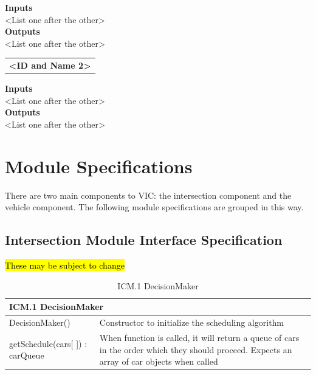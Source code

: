 \documentclass [10pt]{article}
\begin{document}
\textbf{Inputs} \\
<List one after the other> \\

\textbf{Outputs} \\
<List one after the other> \\

\begin{longtable}{p{}}
\rowcolor{tableCell}\textbf{<ID and Name 2>} \\
\end{longtable}

\textbf{Inputs} \\
<List one after the other> \\

\textbf{Outputs} \\
<List one after the other> \\



\section{Module Specifications}

There are two main components to VIC: the intersection component and the vehicle component. The following module specifications are grouped in this way. 
\subsection{Intersection Module Interface Specification}

    \begin{center}
        \hl{These may be subject to change}
    \end{center}

\begin{longtable}{| p{ } | p{ } | }\caption{ICM.1 DecisionMaker} \\\hline  
 \multicolumn{2}{|l|}{\textbf {ICM.1 DecisionMaker}}\\ \hline
 
\cellcolor{tableCell}DecisionMaker()& \cellcolor{tableCell}Constructor to initialize the scheduling algorithm \\ \hline 

getSchedule(cars[ ]) : carQueue & When function is called, it will return a queue of cars in the order which they should proceed. Expects an array of car objects when called\\ \hline 



\end{longtable}
\end{document}
